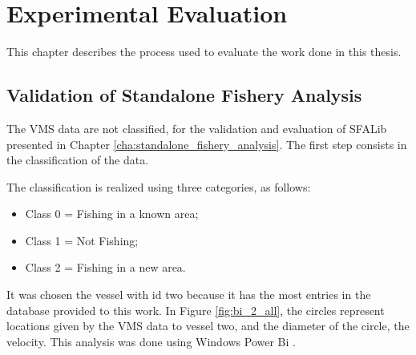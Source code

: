 % 
% 
%
\chapter{Experimental Evaluation}
\label{cha:validation}

This chapter describes the process used to evaluate the work done in this thesis.

\section{Validation of Standalone Fishery Analysis} %
\label{sec:val_SFA}

The VMS data are not classified, for the validation and evaluation of SFALib presented in Chapter \ref{cha:standalone_fishery_analysis}. The first step consists in the classification of the data.

The classification is realized using three categories, as follows:
\begin{itemize}
\item Class 0 = Fishing in a known area;
\item Class 1 = Not Fishing;
\item Class 2 = Fishing in a new area.
\end{itemize} 


It was chosen the vessel with id two because it has the most entries in the database provided to this work. In Figure \ref{fig:bi_2_all}, the circles represent locations given by the VMS data to vessel two, and the diameter of the circle, the velocity. This analysis was done using Windows Power Bi \cite{WEBSITE:PowerBi}.

